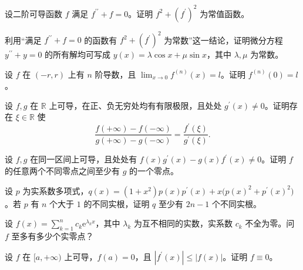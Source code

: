 \noindent\begin{minipage}{\textwidth}
设二阶可导函数 $f$ 满足 $f^{\prime\prime}+f=0$。证明 $f^2+(f^{\prime})^2$ 为常值函数。
\end{minipage}\par\vfill
\newpage
\noindent\begin{minipage}{\textwidth}
利用“满足 $f^{\prime\prime}+f=0$ 的函数有 $f^2+(f^{\prime})^2$ 为常数”这一结论，证明微分方程 $y^{\prime\prime}+y=0$ 的所有解均可写成 $y(x)=\lambda\cos x+\mu\sin x$，其中 $\lambda,\mu$ 为常数。
\end{minipage}\par\vfill
\noindent\begin{minipage}{\textwidth}
设 $f$ 在 $(-r,r)$ 上有 $n$ 阶导数，且 $\lim_{x\to0}f^{(n)}(x)=l$。证明 $f^{(n)}(0)=l$。
\end{minipage}\par\vfill
\noindent\begin{minipage}{\textwidth}
设 $f,g$ 在 $\mathbb R$ 上可导，在正、负无穷处均有有限极限，且处处 $g^{\prime}(x)\ne0$。证明存在 $\xi\in\mathbb R$ 使\[\frac{f(+\infty)-f(-\infty)}{g(+\infty)-g(-\infty)}=\frac{f^{\prime}(\xi)}{g^{\prime}(\xi)}.\]
\end{minipage}\par\vfill
\newpage
\noindent\begin{minipage}{\textwidth}
设 $f,g$ 在同一区间上可导，且处处有 $f(x)g^{\prime}(x)-g(x)f^{\prime}(x)\ne0$。证明 $f$ 的任意两个不同零点之间至少有 $g$ 的一个零点。
\end{minipage}\par\vfill
\noindent\begin{minipage}{\textwidth}
设 $p$ 为实系数多项式，$q(x)=(1+x^2)p(x)p^{\prime}(x)+x\bigl(p(x)^2+p^{\prime}(x)^2\bigr)$。若 $p$ 有 $n$ 个大于 $1$ 的不同实根，证明 $q$ 至少有 $2n-1$ 个不同实根。
\end{minipage}\par\vfill
\noindent\begin{minipage}{\textwidth}
设 $f(x)=\sum_{k=1}^n c_k\mathrm e^{\lambda_kx}$，其中 $\lambda_k$ 为互不相同的实数，实系数 $c_k$ 不全为零。问 $f$ 至多有多少个实零点？
\end{minipage}\par\vfill
\newpage
\noindent\begin{minipage}{\textwidth}
设 $f$ 在 $[a,+\infty)$ 上可导，$f(a)=0$，且 $|f^{\prime}(x)|\le|f(x)|$。证明 $f\equiv0$。
\end{minipage}\par\vfill
